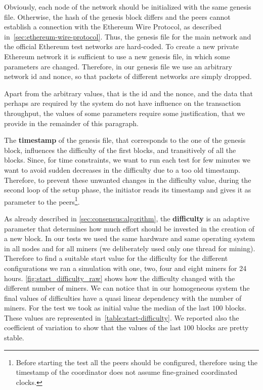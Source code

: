 Obviously, each node of the network should be initialized with the same genesis
file. Otherwise, the hash of the genesis block differs and the peers cannot
establish a connection with the Ethereum Wire Protocol, as described
in~\autoref{sec:ethereum-wire-protocol}. Thus, the genesis file for the main
network  and the official Ethereum test networks are hard-coded. To create a new
private Ethereum network it is sufficient to use a new genesis file, in which
some parameters are changed. Therefore, in our genesis file we use an arbitrary
network id and nonce, so that packets of different networks are simply dropped.

Apart from the arbitrary values, that is the id and the nonce, and the data that
perhaps are required by the system do not have influence on the transaction
throughput, the values of some parameters require some justification, that we
provide in the remainder of this paragraph.

The \textbf{timestamp} of the genesis file, that corresponds to the one of the
genesis block, influences the difficulty of the first blocks, and transitively
of all the blocks. Since, for time constraints, we want to run each test for few
minutes we want to avoid sudden decreases in the difficulty due to a too old
timestamp. Therefore, to prevent these unwanted changes in the difficulty value,
during the second loop of the setup phase, the initiator reads its timestamp and
gives it as parameter to the peers\footnote{Before starting the test all the
peers should be configured, therefore using the timestamp of the coordinator
does not assume fine-grained coordinated clocks.}.

As already described in \autoref{sec:consensus:algorithm}, the
\textbf{difficulty} is an adaptive parameter that determines how much effort
should be invested in the creation of a new block. In our tests we used the same
hardware and same operating system in all nodes and for all miners (we
deliberately used only one thread for mining). Therefore to find a suitable
start value for the difficulty for the different configurations we ran a
simulation with one, two, four and eight miners for 24 hours.
\autoref{fig:start_difficulty_raw} shows how the difficulty changed with the
different number of miners. We can notice that in our homogeneous system the
final values of difficulties have a quasi linear dependency with the number of
miners. For the test we took as initial value the median of the last $100$
blocks. These values are represented in~\autoref{table:start-difficulty}. We
reported also the coefficient of variation to show that the values of the last
$100$ blocks are pretty stable.


